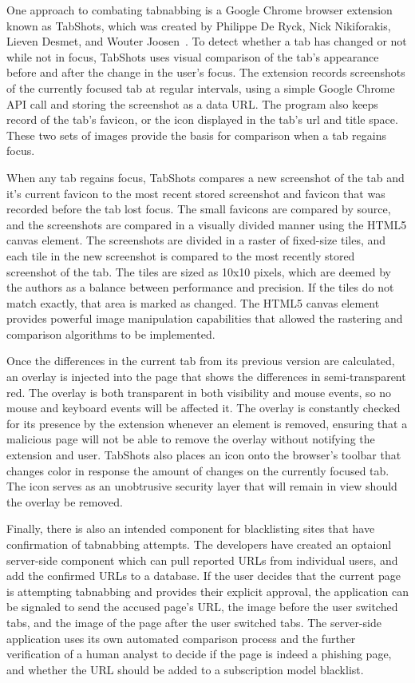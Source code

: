 \documentclass[12pt]{article}
\begin{document}
\begin{doublespace}
One approach to combating tabnabbing is a Google Chrome browser extension known as TabShots, which was created by Philippe De Ryck, Nick Nikiforakis, Lieven Desmet, and Wouter Joosen~\cite{TabShots}.  To detect whether a tab has changed or not while not in focus, TabShots uses visual comparison of the tab's appearance before and after the change in the user's focus.  The extension records screenshots of the currently focused tab at regular intervals, using a simple Google Chrome API call and storing the screenshot as a data URL.  The program also keeps record of the tab's favicon, or the icon displayed in the tab's url and title space.  These two sets of images provide the basis for comparison when a tab regains focus.

When any tab regains focus, TabShots compares a new screenshot of the tab and it's current favicon to the most recent stored screenshot and favicon that was recorded before the tab lost focus.  The small favicons are compared by source, and the screenshots are compared in a visually divided manner using the HTML5 canvas element.  The screenshots are divided in a raster of fixed-size tiles, and each tile in the new screenshot is compared to the most recently stored screenshot of the tab.  The tiles are sized as 10x10 pixels, which are deemed by the authors as a balance between performance and precision.  If the tiles do not match exactly, that area is marked as changed.  The HTML5 canvas element provides powerful image manipulation capabilities that allowed the rastering and comparison algorithms to be implemented.

Once the differences in the current tab from its previous version are calculated, an overlay is injected into the page that shows the differences in semi-transparent red.  The overlay is both transparent in both visibility and mouse events, so no mouse and keyboard events will be affected it.  The overlay is constantly checked for its presence by the extension whenever an element is removed, ensuring that a malicious page will not be able to remove the overlay without notifying the extension and user.  TabShots also places an icon onto the browser's toolbar that changes color in response the amount of changes on the currently focused tab.  The icon serves as an unobtrusive security layer that will remain in view should the overlay be removed.

Finally, there is also an intended component for blacklisting sites that have confirmation of tabnabbing attempts.  The developers have created an optaionl server-side component which can pull reported URLs from individual users, and add the confirmed URLs to a database.  If the user decides that the current page is attempting tabnabbing and provides their explicit approval, the application can be signaled to send the accused page's URL, the image before the user switched tabs, and the image of the page after the user switched tabs.  The server-side application uses its own automated comparison process and the further verification of a human analyst to decide if the page is indeed a phishing page, and whether the URL should be added to a subscription model blacklist.  


\end{doublespace}
\end{document}
